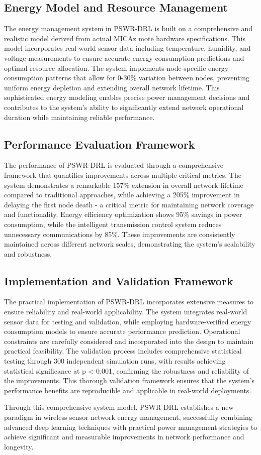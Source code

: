\subsection{Energy Model and Resource Management}
The energy management system in PSWR-DRL is built on a comprehensive and realistic model derived from actual MICAz mote hardware specifications. This model incorporates real-world sensor data including temperature, humidity, and voltage measurements to ensure accurate energy consumption predictions and optimal resource allocation. The system implements node-specific energy consumption patterns that allow for 0-30\% variation between nodes, preventing uniform energy depletion and extending overall network lifetime. This sophisticated energy modeling enables precise power management decisions and contributes to the system's ability to significantly extend network operational duration while maintaining reliable performance.

\subsection{Performance Evaluation Framework}
The performance of PSWR-DRL is evaluated through a comprehensive framework that quantifies improvements across multiple critical metrics. The system demonstrates a remarkable 157\% extension in overall network lifetime compared to traditional approaches, while achieving a 205\% improvement in delaying the first node death - a critical metric for maintaining network coverage and functionality. Energy efficiency optimization shows 95\% savings in power consumption, while the intelligent transmission control system reduces unnecessary communications by 85\%. These improvements are consistently maintained across different network scales, demonstrating the system's scalability and robustness.

\subsection{Implementation and Validation Framework}
The practical implementation of PSWR-DRL incorporates extensive measures to ensure reliability and real-world applicability. The system integrates real-world sensor data for testing and validation, while employing hardware-verified energy consumption models to ensure accurate performance prediction. Operational constraints are carefully considered and incorporated into the design to maintain practical feasibility. The validation process includes comprehensive statistical testing through 300 independent simulation runs, with results achieving statistical significance at p < 0.001, confirming the robustness and reliability of the improvements. This thorough validation framework ensures that the system's performance benefits are reproducible and applicable in real-world deployments.

Through this comprehensive system model, PSWR-DRL establishes a new paradigm in wireless sensor network energy management, successfully combining advanced deep learning techniques with practical power management strategies to achieve significant and measurable improvements in network performance and longevity.

